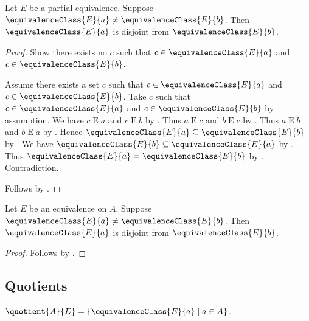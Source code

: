 \begin{proposition}\label{equivclasses_diseq_implies_disjoint}
    Let $E$ be a partial equivalence.
    Suppose $\equivalenceClass{E}{a}\neq \equivalenceClass{E}{b}$.
    Then $\equivalenceClass{E}{a}$ is disjoint from $\equivalenceClass{E}{b}$.
\end{proposition}
\begin{proof}
    Show there exists no $c$ such that
        $c\in\equivalenceClass{E}{a}$ and
        $c\in\equivalenceClass{E}{b}$.
    \begin{subproof}
        Assume there exists a set $c$ such that
            $c\in\equivalenceClass{E}{a}$ and
            $c\in\equivalenceClass{E}{b}$.
        Take $c$ such that $c\in\equivalenceClass{E}{a}$ and
            $c\in\equivalenceClass{E}{b}$ by assumption.
        We have $c\mathrel{E}a$ and $c\mathrel{E}b$
            by .
        Thus $a\mathrel{E}c$ and $b\mathrel{E}c$ by .
        Thus $a\mathrel{E}b$ and $b\mathrel{E}a$ by .
        Hence $\equivalenceClass{E}{a}\subseteq\equivalenceClass{E}{b}$
            by .
        We have $\equivalenceClass{E}{b}\subseteq\equivalenceClass{E}{a}$
            by .
        Thus $\equivalenceClass{E}{a}=\equivalenceClass{E}{b}$
            by .
        Contradiction.
    \end{subproof}
    Follows by .
\end{proof}

\begin{corollary}\label{equivalenceon_equivclasses_diseq_implies_disjoint}
    Let $E$ be an equivalence on $A$.
    Suppose $\equivalenceClass{E}{a}\neq \equivalenceClass{E}{b}$.
    Then $\equivalenceClass{E}{a}$ is disjoint from $\equivalenceClass{E}{b}$.
\end{corollary}
\begin{proof}
    Follows by
        .
\end{proof}


\subsection{Quotients}

\begin{definition}\label{quotient}
    $\quotient{A}{E} = \{\equivalenceClass{E}{a}\mid a\in A\}$.
\end{definition}

